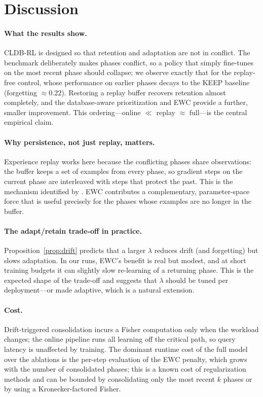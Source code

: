 \section{Discussion}
\label{sec:discussion}

\paragraph{What the results show.}
CLDB-RL is designed so that retention and adaptation are not in conflict. The
benchmark deliberately makes phases conflict, so a policy that simply fine-tunes
on the most recent phase should collapse; we observe exactly that for the
replay-free control, whose performance on earlier phases decays to the KEEP
baseline (forgetting \(\approx 0.22\)). Restoring a replay buffer recovers
retention almost completely, and the database-aware prioritization and EWC
provide a further, smaller improvement. This ordering---online $\ll$ replay
$\approx$ full---is the central empirical claim.

\paragraph{Why persistence, not just replay, matters.}
Experience replay works here because the conflicting phases share observations:
the buffer keeps a set of examples from every phase, so gradient steps on the
current phase are interleaved with steps that protect the past. This is the
mechanism identified by \citet{rolnick2019replay}. EWC contributes a
complementary, parameter-space force that is useful precisely for the phases
whose examples are no longer in the buffer.

\paragraph{The adapt/retain trade-off in practice.}
Proposition~\ref{prop:drift} predicts that a larger \(\lambda\) reduces drift
(and forgetting) but slows adaptation. In our runs, EWC's benefit is real but
modest, and at short training budgets it can slightly slow re-learning of a
returning phase. This is the expected shape of the trade-off and suggests that
\(\lambda\) should be tuned per deployment---or made adaptive, which is a natural
extension.

\paragraph{Cost.}
Drift-triggered consolidation incurs a Fisher computation only when the workload
changes; the online pipeline runs all learning off the critical path, so query
latency is unaffected by training. The dominant runtime cost of the full model
over the ablations is the per-step evaluation of the EWC penalty, which grows
with the number of consolidated phases; this is a known cost of regularization
methods and can be bounded by consolidating only the most recent $k$ phases or by
using a Kronecker-factored Fisher.

